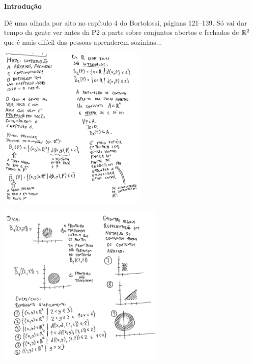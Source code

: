 \documentclass[oneside,12pt]{article}
\begin{document}
{\bf Introdução}

\ssk

Dê uma olhada por alto no capítulo 4 do Bortolossi, páginas 121--139.
Só vai dar tempo da gente ver antes da P2 a parte sobre conjuntos
abertos e fechados de $\mathbb{R}^2$ que é mais difícil das pessoas aprenderem
sozinhas...



\newpage



\includegraphics[height=8cm]{2020-1-C3/topo1.pdf}

\newpage

\includegraphics[height=8cm]{2020-1-C3/topo2.pdf}
\end{document}
